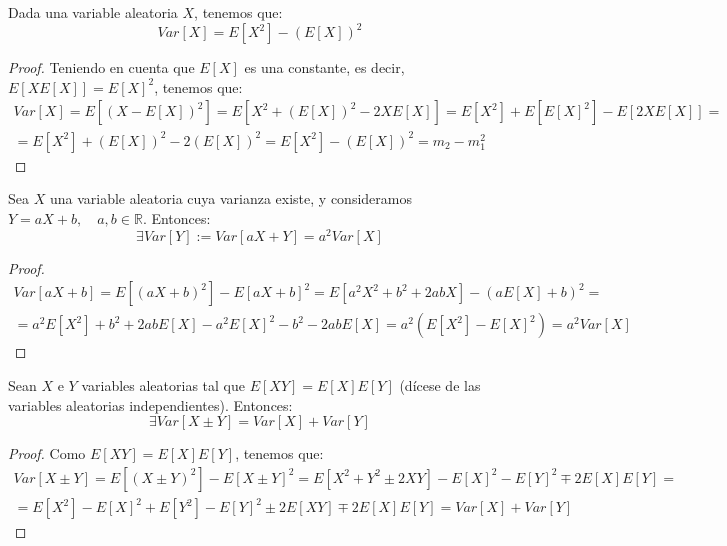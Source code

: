 \begin{prop}
    Dada una variable aleatoria $X$, tenemos que:
    \begin{equation*}
        Var[X] = E[X^2] - (E[X])^2
    \end{equation*}
\end{prop}
\begin{proof}
    Teniendo en cuenta que $E[X]$ es una constante, es decir, $E[XE[X]]=E[X]^2$, tenemos que:
    \begin{multline*}
        Var[X] = E[(X-E[X])^2] = E[X^2 + (E[X])^2 - 2XE[X]]
        = E[X^2] + E[E[X]^2] - E[2XE[X]] =\\=
        E[X^2] + (E[X])^2 -2(E[X])^2
        = E[X^2] - (E[X])^2 = m_2-m_1^2
    \end{multline*}
\end{proof}


\begin{prop}
    Sea $X$ una variable aleatoria cuya varianza existe, y consideramos $Y=aX+b,\quad a,b\in \mathbb{R}$. Entonces:
    \begin{equation*}
        \exists Var[Y] := Var[aX+Y] = a^2Var[X]
    \end{equation*}
\end{prop}
\begin{proof}
    \begin{multline*}
        Var[aX+b]
        = E[(aX+b)^2] -E[aX+b]^2
        = E[a^2X^2 + b^2 +2abX] - (aE[X]+b)^2
        =\\= a^2E[X^2] + b^2 +2abE[X] -a^2E[X]^2 -b^2 -2abE[X] =  a^2(E[X^2] - E[X]^2) = a^2Var[X]
    \end{multline*}
\end{proof}


\begin{prop}
    Sean $X$ e $Y$ variables aleatorias tal que $E[XY]=E[X]E[Y]$ (dícese de las variables aleatorias independientes). Entonces:
    \begin{equation*}
        \exists  Var[X\pm Y] = Var[X] + Var[Y]
    \end{equation*}
\end{prop}
\begin{proof}
    Como $E[XY]=E[X]E[Y]$, tenemos que:
    \begin{multline*}
        Var[X \pm Y] = E[(X\pm Y)^2] - E[X\pm Y]^2
        = E[X^2 + Y^2 \pm 2XY] - E[X]^2 - E[Y]^2 \mp 2E[X]E[Y]
        =\\= E[X^2] - E[X]^2 + E[Y^2] -E[Y]^2 \pm 2E[XY] \mp 2E[X]E[Y] = Var[X] + Var[Y]
    \end{multline*}
\end{proof}


